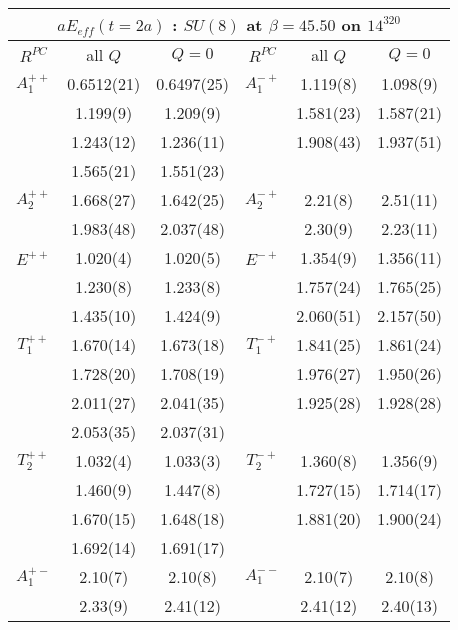 \documentclass[12pt]{article}
\begin{document}
\begin{table}[htb]
\centering
\begin{tabular}{|c|c|c||c|c|c|} \hline
\multicolumn{6}{|c|}{$aE_{eff}(t=2a)$ : $SU(8)$ at $\beta=45.50$ on $14^320$} \\ \hline
  $R^{PC}$   & all $Q$ & $Q=0$ &  $R^{PC}$   & all $Q$ & $Q=0$  \\ \hline \hline
$A_1^{++}$  & 0.6512(21) & 0.6497(25) & $A_1^{-+}$ & 1.119(8)  & 1.098(9)  \\
          &  1.199(9)  & 1.209(9)  &          & 1.581(23)  & 1.587(21)  \\
          &  1.243(12) & 1.236(11) &          & 1.908(43)  & 1.937(51)  \\
          &  1.565(21) & 1.551(23) &          &            &           \\ \hline
$A_2^{++}$  &  1.668(27) & 1.642(25) & $A_2^{-+}$ & 2.21(8)  & 2.51(11)  \\
          &  1.983(48) & 2.037(48) &          &  2.30(9)  & 2.23(11)  \\ \hline
$E^{++}$   & 1.020(4)  & 1.020(5)   & $E^{-+}$  & 1.354(9)  & 1.356(11)  \\
          & 1.230(8)  & 1.233(8)   &          & 1.757(24)  & 1.765(25)  \\
          & 1.435(10) & 1.424(9)   &          & 2.060(51)  & 2.157(50)  \\ \hline
$T_1^{++}$  & 1.670(14) & 1.673(18) & $T_1^{-+}$ & 1.841(25)   & 1.861(24)  \\
          & 1.728(20) & 1.708(19) &          & 1.976(27)   & 1.950(26)  \\
          & 2.011(27) & 2.041(35) &          & 1.925(28)   & 1.928(28)  \\
          & 2.053(35) & 2.037(31) &          &             &           \\ \hline
$T_2^{++}$  & 1.032(4)  & 1.033(3) & $T_2^{-+}$ & 1.360(8)    &  1.356(9) \\
          & 1.460(9)  & 1.447(8)  &          & 1.727(15)   & 1.714(17)  \\
          & 1.670(15) & 1.648(18) &          & 1.881(20)   & 1.900(24)  \\
          & 1.692(14) & 1.691(17) &          &             &          \\ \hline
$A_1^{+-}$  & 2.10(7)  & 2.10(8)   & $A_1^{--}$ & 2.10(7)   & 2.10(8)  \\
          & 2.33(9)   & 2.41(12)   &         & 2.41(12)  & 2.40(13)  \\ \hline

\end{tabular}
\end{table}
\end{document}
